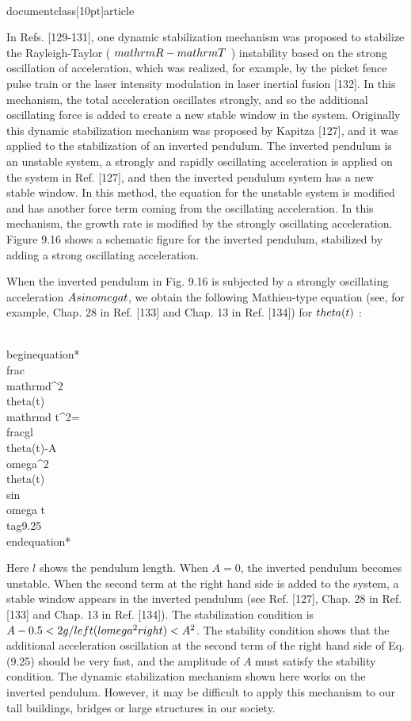 \\documentclass[10pt]{article}
\begin{document}
{{{{{{In Refs. [129-131], one dynamic stabilization mechanism was proposed to stabilize the Rayleigh-Taylor ( $\\mathrm{R}-\\mathrm{T}$ ) instability based on the strong oscillation of acceleration, which was realized, for example, by the picket fence pulse train or the laser intensity modulation in laser inertial fusion [132]. In this mechanism, the total acceleration oscillates strongly, and so the additional oscillating force is added to create a new stable window in the system. Originally this dynamic stabilization mechanism was proposed by Kapitza [127], and it was applied to the stabilization of an inverted pendulum. The inverted pendulum is an unstable system, a strongly and rapidly oscillating acceleration is applied on the system in Ref. [127], and then the inverted pendulum system has a new stable window. In this method, the equation for the unstable system is modified and has another force term coming from the oscillating acceleration. In this mechanism, the growth rate is modified by the strongly oscillating acceleration. Figure 9.16 shows a schematic figure for the inverted pendulum, stabilized by adding a strong oscillating acceleration.

When the inverted pendulum in Fig. 9.16 is subjected by a strongly oscillating acceleration $A \\sin \\omega t$, we obtain the following Mathieu-type equation (see, for example, Chap. 28 in Ref. [133] and Chap. 13 in Ref. [134]) for $\\theta(t)$ :


\\begin{equation*}
\\frac{\\mathrm{d}^{2} \\theta(t)}{\\mathrm{d} t^{2}}=\\frac{g}{l} \\theta(t)-A \\omega^{2} \\theta(t) \\sin \\omega t \\tag{9.25}
\\end{equation*}


Here $l$ shows the pendulum length. When $A=0$, the inverted pendulum becomes unstable. When the second term at the right hand side is added to the system, a stable window appears in the inverted pendulum (see Ref. [127], Chap. 28 in Ref. [133] and Chap. 13 in Ref. [134]). The stabilization condition is $A-0.5<2 g /\\left(l \\omega^{2}\\right)<A^{2}$. The stability condition shows that the additional acceleration oscillation at the second term of the right hand side of Eq. (9.25) should be very fast, and the amplitude of $A$ must satisfy the stability condition. The dynamic stabilization mechanism shown here works on the inverted pendulum. However, it may be difficult to apply this mechanism to our tall buildings, bridges or large structures in our society.

}}}}}}
\end{document}
